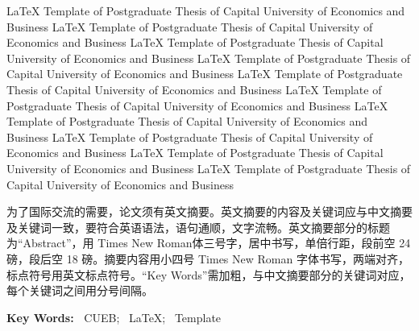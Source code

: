 \begin{abstracten}
LaTeX Template of Postgraduate Thesis of Capital University of Economics and Business LaTeX Template of Postgraduate Thesis of Capital University of Economics and Business LaTeX Template of Postgraduate Thesis of Capital University of Economics and Business LaTeX Template of Postgraduate Thesis of Capital University of Economics and Business LaTeX Template of Postgraduate Thesis of Capital University of Economics and Business LaTeX Template of Postgraduate Thesis of Capital University of Economics and Business LaTeX Template of Postgraduate Thesis of Capital University of Economics and Business LaTeX Template of Postgraduate Thesis of Capital University of Economics and Business LaTeX Template of Postgraduate Thesis of Capital University of Economics and Business LaTeX Template of Postgraduate Thesis of Capital University of Economics and Business

为了国际交流的需要，论文须有英文摘要。英文摘要的内容及关键词应与中文摘要及关键词一致，要符合英语语法，语句通顺，文字流畅。英文摘要部分的标题为“Abstract”，用 Times New Roman体三号字，居中书写，单倍行距，段前空 24 磅，段后空 18 磅。摘要内容用小四号 Times New Roman 字体书写，两端对齐，标点符号用英文标点符号。“Key Words”需加粗，与中文摘要部分的关键词对应，每个关键词之间用分号间隔。

\textbf{Key Words:~} CUEB;~ LaTeX;~ Template

\end{abstracten} 